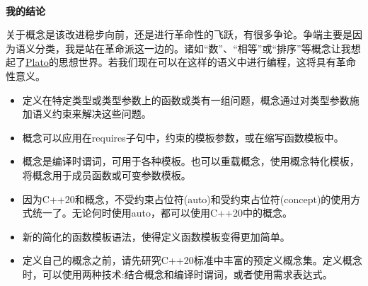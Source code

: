 \begin{tcolorbox}[breakable,enhanced jigsaw,colback=blue!5!white,colframe=blue!75!black,title={常规类型}]
\hspace*{\fill} \\ %
\noindent
\textbf{我的结论}

关于概念是该改进稳步向前，还是进行革命性的飞跃，有很多争论。争端主要是因为语义分类，我是站在革命派这一边的。诸如“数”、“相等”或“排序”等概念让我想起了\href{https://en.wikipedia.org/wiki/Plato}{Plato}的思想世界。若我们现在可以在这样的语义中进行编程，这将具有革命性意义。
\end{tcolorbox}

\begin{tcolorbox}[breakable,enhanced jigsaw,colback=mygreen!5!white,colframe=mygreen!75!black,title={总结}]
\begin{itemize}
\item
定义在特定类型或类型参数上的函数或类有一组问题，概念通过对类型参数施加语义约束来解决这些问题。

\item
概念可以应用在requires子句中，约束的模板参数，或在缩写函数模板中。

\item
概念是编译时谓词，可用于各种模板。也可以重载概念，使用概念特化模板，将概念用于成员函数或可变参数模板。

\item
因为C++20和概念，不受约束占位符(auto)和受约束占位符(concept)的使用方式统一了。无论何时使用auto，都可以使用C++20中的概念。

\item
新的简化的函数模板语法，使得定义函数模板变得更加简单。

\item
定义自己的概念之前，请先研究C++20标准中丰富的预定义概念集。定义概念时，可以使用两种技术:结合概念和编译时谓词，或者使用需求表达式。
\end{itemize}
\end{tcolorbox}

\newpage

















